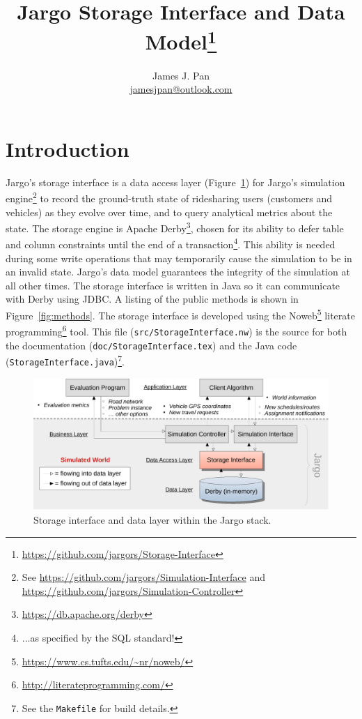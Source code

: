 \documentclass{article}
\title{Jargo Storage Interface
  and Data Model\footnote{\url{https://github.com/jargors/Storage-Interface}}}
\author{James J. Pan\\
  \small{\href{mailto:jamesjpan@outlook.com}{jamesjpan@outlook.com}}
}
\theoremstyle{definition}
\begin{document}
\maketitle
\pagestyle{noweb}

\tableofcontents

\section{Introduction}
\label{sec:introduction}
Jargo's storage interface is a data access layer (Figure~\ref{fig:storage}) for
Jargo's simulation
engine\footnote{See \url{https://github.com/jargors/Simulation-Interface}
and \url{https://github.com/jargors/Simulation-Controller}}
to record the ground-truth state of ridesharing users (customers and vehicles)
as they evolve over time, and to query analytical metrics about the state.  The
storage engine is Apache Derby\footnote{\url{https://db.apache.org/derby}},
chosen for its ability to defer table and column constraints until the end of a
transaction\footnote{...as specified by the SQL standard!}.  This ability is
needed during some write operations that may temporarily cause the simulation
to be in an invalid state. Jargo's data model guarantees the integrity of the
simulation at all other times. The storage interface is written in Java so it
can communicate with Derby using JDBC. A listing of the public methods is
shown in Figure~\ref{fig:methods}.
The storage interface is developed using the
Noweb\footnote{\url{https://www.cs.tufts.edu/~nr/noweb/}} literate
programming\footnote{\url{http://literateprogramming.com/}} tool.  This file
({\tt{}src/StorageInterface.nw}) is the source for both the documentation
({\tt{}doc/StorageInterface.tex}) and the Java code ({\tt{}StorageInterface.java})\footnote{See the
{\tt{}Makefile} for build details.}.

\begin{figure}[h]
\centering
\includegraphics[width=150mm]{src/fig/storage-fig}
\caption{Storage interface and data layer within the Jargo stack.}
\label{fig:storage}
\end{figure}
\end{document}
